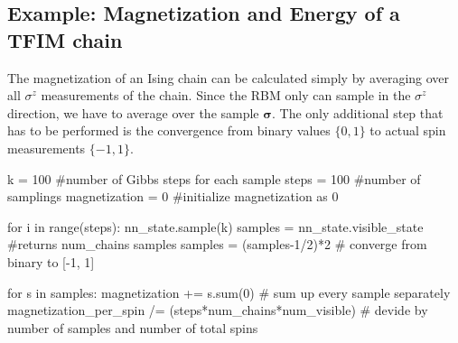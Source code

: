 \documentclass[submission, Phys]{SciPost}
\begin{document}
\subsection{Example: Magnetization and Energy of a TFIM chain}

The magnetization of an Ising chain can be calculated simply by averaging over all $\sigma^z$ measurements of the chain. Since the RBM only can sample in the $\sigma^z$ direction, we have to average over the sample $\bm{\sigma}$. The only additional step that has to be performed is the convergence from binary values $\{0,1  \}$ to actual spin measurements $\{-1 ,1  \}$.

\begin{python}
k = 100 #number of Gibbs steps for each sample
steps = 100 #number of samplings
magnetization = 0 #initialize magnetization as 0

for i in range(steps):
	nn_state.sample(k)
	samples = nn_state.visible_state #returns num_chains samples
	samples = (samples-1/2)*2 # converge from binary to [-1, 1]

	for s in samples: 
		magnetization += s.sum(0) # sum up every sample separately
magnetization_per_spin /= (steps*num_chains*num_visible) # devide by number of samples and number of total spins
\end{python}

\end{document}
